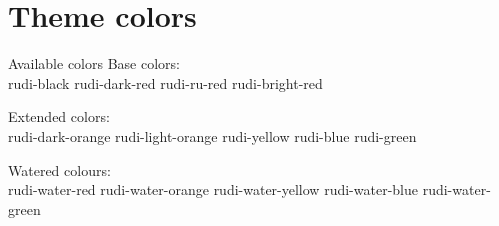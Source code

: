 \documentclass{beamer}
\begin{document}
\section{Theme colors} 
\sectionframe

\begin{frame}{Available colors}
Base colors:\\
\colorbox{rudi-black}{\color{white} rudi-black}
\colorbox{rudi-dark-red}{\color{white} rudi-dark-red}
\colorbox{rudi-ru-red}{\color{white} rudi-ru-red}
\colorbox{rudi-bright-red}{\color{white} rudi-bright-red}
\vspace{1em}

Extended colors:\\
\colorbox{rudi-dark-orange}{\color{white} rudi-dark-orange}
\colorbox{rudi-light-orange}{rudi-light-orange}
\colorbox{rudi-yellow}{rudi-yellow}
\colorbox{rudi-blue}{\color{white} rudi-blue}
\colorbox{rudi-green}{\color{white} rudi-green}
\vspace{1em}

Watered colours:\\
\colorbox{rudi-water-red}{rudi-water-red}
\colorbox{rudi-water-orange}{rudi-water-orange}
\colorbox{rudi-water-yellow}{rudi-water-yellow}
\colorbox{rudi-water-blue}{rudi-water-blue}
\colorbox{rudi-water-green}{rudi-water-green}
\end{frame}
\end{document}

